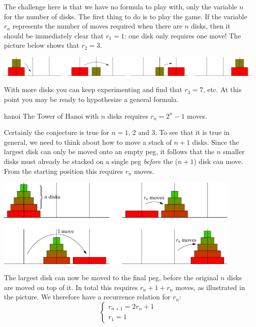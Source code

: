 The challenge here is that we have no formula to play with, only the variable $n$ for the number of disks. The first thing to do is to play the game. If the variable $r_n$ represents the number of moves required when there are $n$ disks, then it should be immediately clear that $r_1=1$: one disk only requires one move! The picture below shows that $r_2=3$.
\begin{center}
	\includegraphics[width=\textwidth]{induction-03-hanoi2}
\end{center}

With more disks you can keep experimenting and find that $r_3=7$, etc. At this point you may be ready to hypothesize a general formula.

\begin{conj}{}{hanoi}
	The Tower of Hanoi with $n$ disks requires $r_n=2^n-1$ moves.
\end{conj}


Certainly the conjecture is true for $n=1$, 2 and 3. To see that it is true in general, we need to think about how to move a stack of $n+1$ disks. Since the largest disk can only be moved onto an empty peg, it follows that the $n$ smaller disks must already be stacked on a single peg \emph{before} the ($n+1$)\th{} disk can move. From the starting position this requires $r_n$ moves.

\begin{center}
	\includegraphics[width=0.9\textwidth]{induction-04-hanoirn}
\end{center}

The largest disk can now be moved to the final peg, before the original $n$ disks are moved on top of it. In total this requires $r_n+1+r_n$ moves, as illustrated in the picture. We therefore have a recurrence relation for $r_n$:
\[
	\begin{cases}
		r_{n+1}=2r_n+1\\
		r_1=1
	\end{cases}
\]

